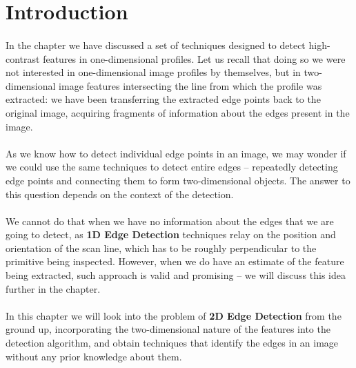 \section{Introduction}

\paragraph*{}
In the  chapter we have discussed a set of techniques designed to detect high-contrast features in one-dimensional profiles. Let us recall that doing so we were not interested in one-dimensional image profiles by themselves, but in two-dimensional image features intersecting the line from which the profile was extracted: we have been transferring the extracted edge points back to the original image, acquiring fragments of information about the edges present in the image.

\paragraph*{}
As we know how to detect individual edge points in an image, we may wonder if we could use the same techniques to detect entire edges -- repeatedly detecting edge points and connecting them to form two-dimensional objects. The answer to this question depends on the context of the detection.

\paragraph*{}
We cannot do that when we have no information about the edges that we are going to detect, as \textbf{1D Edge Detection} techniques relay on the position and orientation of the scan line, which has to be roughly perpendicular to the primitive being inspected. However, when we do have an estimate of the feature being extracted, such approach is valid and promising -- we will discuss this idea further in the  chapter.

\paragraph*{}
In this chapter we will look into the problem of \textbf{2D Edge Detection} from the ground up, incorporating the two-dimensional nature of the features into the detection algorithm, and obtain techniques that identify the edges in an image without any prior knowledge about them.


